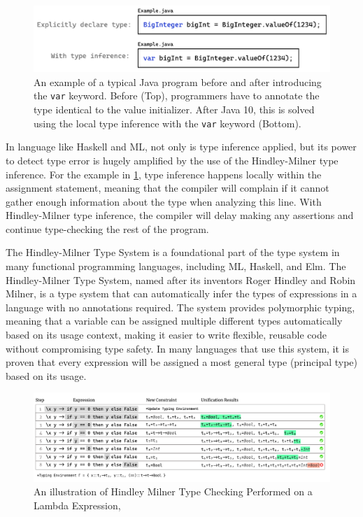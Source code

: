\begin{figure}[hbt]
  \includegraphics[width=\linewidth]{ExampleJava}
  \caption{
    \label{fig:example-java}
      An example of a typical Java program before and after introducing the \texttt{var} keyword. Before (Top), programmers have to annotate the type identical to the value initializer. After Java 10, this is solved using the local type inference with the \texttt{var} keyword (Bottom).
    }
\end{figure}

In language like Haskell and ML, not only is type inference applied, but its power to detect type error is hugely amplified by the use of the Hindley-Milner type inference. For the example in \ref{fig:example-java}, type inference happens locally within the assignment statement, meaning that the compiler will complain if it cannot gather enough information about the type when analyzing this line. With Hindley-Milner type inference, the compiler will delay making any assertions and continue type-checking the rest of the program. 

The Hindley-Milner Type System \cite{Damas1982-zw} is a foundational part of the type system in many functional programming languages, including ML, Haskell, and Elm. The Hindley-Milner Type System, named after its inventors Roger Hindley and Robin Milner, is a type system that can automatically infer the types of expressions in a language with no annotations required. The system provides polymorphic typing, meaning that a variable can be assigned multiple different types automatically based on its usage context, making it easier to write flexible, reusable code without compromising type safety. In many languages that use this system, it is proven that every expression will be assigned a most general type (principal type) based on its usage. 



\begin{figure}[hbt]
    \includegraphics[width=\linewidth]{HindleyMilner}
    \caption{
      \label{fig:hindley-milner}
        An illustration of Hindley Milner Type Checking Performed on a Lambda Expression, }
\end{figure}


